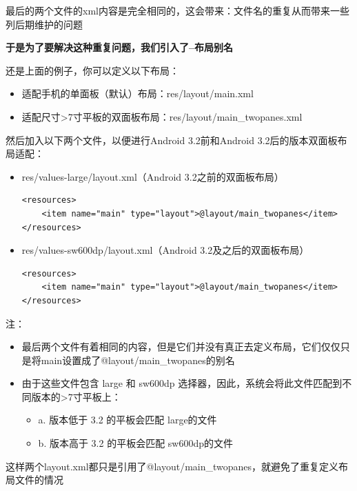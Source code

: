 \documentclass[9pt, b5paper]{article}
\begin{document}
\begin{enumerate}
\begin{enumerate}
\begin{enumerate}
最后的两个文件的xml内容是完全相同的，这会带来：文件名的重复从而带来一些列后期维护的问题

\textbf{于是为了要解决这种重复问题，我们引入了--布局别名} 

还是上面的例子，你可以定义以下布局：
\begin{itemize}
\item 适配手机的单面板（默认）布局：res/layout/main.xml
\item 适配尺寸>7寸平板的双面板布局：res/layout/main\_twopanes.xml
\end{itemize}

然后加入以下两个文件，以便进行Android 3.2前和Android 3.2后的版本双面板布局适配：
\begin{itemize}
\item res/values-large/layout.xml（Android 3.2之前的双面板布局）
\begin{verbatim}
<resources>
    <item name="main" type="layout">@layout/main_twopanes</item>
</resources>
\end{verbatim}
\item res/values-sw600dp/layout.xml（Android 3.2及之后的双面板布局）
\begin{verbatim}
<resources>
    <item name="main" type="layout">@layout/main_twopanes</item>
</resources>
\end{verbatim}
\end{itemize}

注：
\begin{itemize}
\item 最后两个文件有着相同的内容，但是它们并没有真正去定义布局，它们仅仅只是将main设置成了@layout/main\_twopanes的别名
\item 由于这些文件包含 large 和 sw600dp 选择器，因此，系统会将此文件匹配到不同版本的>7寸平板上：
\begin{itemize}
\item a. 版本低于 3.2 的平板会匹配 large的文件
\item b. 版本高于 3.2 的平板会匹配 sw600dp的文件
\end{itemize}
\end{itemize}

这样两个layout.xml都只是引用了@layout/main\_twopanes，就避免了重复定义布局文件的情况


\end{enumerate}
\end{enumerate}
\end{enumerate}
\end{document}

